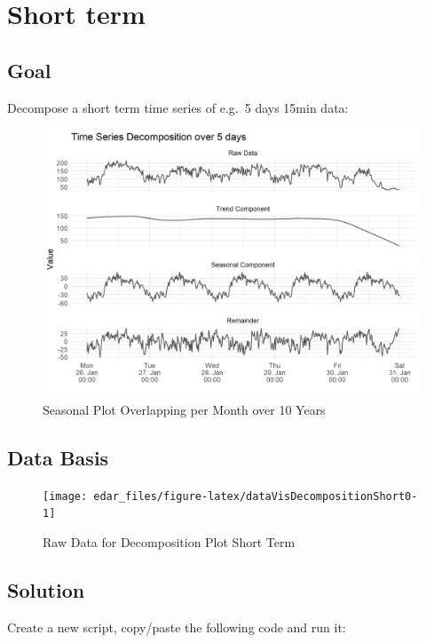 \documentclass[
  a4paperpaper,
]{book}
\begin{document}
\newpage

\hypertarget{short-term}{%
\section{Short term}\label{short-term}}

\hypertarget{goal-5}{%
\subsection{Goal}\label{goal-5}}

Decompose a short term time series of e.g.~5 days 15min data:

\begin{figure}
\includegraphics[width=0.7\linewidth]{images/plotDecompositionShort} \caption{Seasonal Plot Overlapping per Month over 10 Years}\label{fig:unnamed-chunk-15}
\end{figure}

\hypertarget{data-basis-5}{%
\subsection{Data Basis}\label{data-basis-5}}

\begin{figure}
\texttt{[image: edar\_files/figure-latex/dataVisDecompositionShort0-1]} \caption{Raw Data for Decomposition Plot Short Term}\label{fig:dataVisDecompositionShort0}
\end{figure}

\newpage

\hypertarget{solution-5}{%
\subsection{Solution}\label{solution-5}}

Create a new script, copy/paste the following code and run it:
\end{document}
